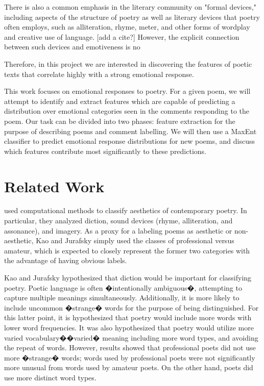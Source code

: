 \documentclass[11pt]{article}
\begin{document}
There is also a common emphasis in the literary community on "formal devices," including aspects of the structure of poetry as well as literary devices that poetry often employs, such as alliteration, rhyme, meter, and other forms of wordplay and creative use of language. [add a cite?] However, the explicit connection between such devices and emotiveness is no

Therefore, in this project we are interested in discovering the features of poetic texts that correlate highly with a strong emotional response.


This work focuses on emotional responses to poetry. For a given poem, we will attempt to identify and extract features which are capable of predicting a distribution over emotional categories seen in the comments responding to the poem. Our task can be divided into two phases: feature extraction for the purpose of describing poems and comment labelling. We will then use a MaxEnt classifier to predict emotional response distributions for new poems, and discuss which features contribute most significantly to these predictions.



\section{Related Work}

 used computational methods to classify aesthetics of contemporary poetry. In particular, they analyzed diction, sound devices (rhyme, alliteration, and assonance), and imagery. As a proxy for a labeling poems as aesthetic or non-aesthetic, Kao and Jurafsky simply used the classes of professional versus amateur, which is expected to closely represent the former two categories with the advantage of having obvious labels.

Kao and Jurafsky hypothesized that diction would be important for classifying poetry. Poetic language is often �intentionally ambiguous�, attempting to capture multiple meanings simultaneously. Additionally, it is more likely to include uncommon �strange� words for the purpose of being distinguished. For this latter point, it is hypothesized that poetry would include more words with lower word frequencies. It was also hypothesized that poetry would utilize more varied vocabulary��varied� meaning including more word types, and avoiding the repeat of words. However, results showed that professional poets did not use more �strange� words; words used by professional poets were not significantly more unusual from words used by amateur poets. On the other hand, poets did use more distinct word types.
\end{document}
